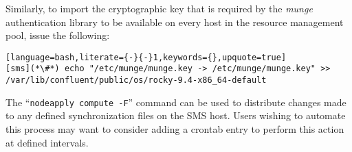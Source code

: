 \noindent Similarly, to import the
cryptographic
key
that is required by the {\em munge}
authentication library to be available on every host in the resource management
pool, issue the following:

\begin{lstlisting}[language=bash,literate={-}{-}1,keywords={},upquote=true]
[sms](*\#*) echo "/etc/munge/munge.key -> /etc/munge/munge.key" >> /var/lib/confluent/public/os/rocky-9.4-x86_64-default
\end{lstlisting}

\begin{center}
\begin{tcolorbox}[]
\small
The ``\texttt{nodeapply compute -F}'' command can be used to distribute changes made to any
defined synchronization files on the SMS host. Users wishing to automate this process may
want to consider adding a crontab entry to perform this action at defined intervals.
\end{tcolorbox}
\end{center}